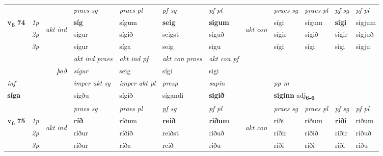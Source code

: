 \begin{longtable}[l]{X>{\footnotesize\itshape}llXXXXlXXXX}
 & &   & \textit{praes sg}  & \textit{praes pl}    & \textit{ pf sg} & \textit{pf pl} & & \textit{praes sg}  & \textit{praes pl}    & \textit{pf sg} & \textit{pf pl }  \\ \cmidrule{4-7} \cmidrule{9-12}
 \multirow{2}{*}{{{\textbf{v{\textsubscript{6}}} \Large{\textbf{74}}}}}  & 1p & \multirow{3}{*}{\begin{turn}{90}\textit{akt ind}\end{turn}} & \textbf{síg} & sígum & \textbf{seig} & \textbf{sigum} & \multirow{3}{*}{\begin{turn}{90}\textit{akt con}\end{turn}} &sígi & sígum & \textbf{sigi} & sigjum\\*
 & 2p &  &  sígur  & sígið & seigst & siguð & & sígir & sígið & sigir & sigjuð \\*
 & 3p &  & sígur & síga & seig & sigu & & sígi & sígi& sigi & sigju \\*
\cmidrule{4-7} \cmidrule{9-12}

   && &  \textit{akt ind praes} & \textit{akt ind pf} & \textit{akt con praes} & \textit{akt con pf} \\*
\multicolumn{3}{r}{\textit{það}} & sígur & seig & sígi & sigi \\*

\cmidrule{4-7}
   {\textit{inf}} & &  & \textit{imper akt sg} & \textit{imper akt pl}   & \textit{presp} & \textit{supin}  && \textit{pp m} \\*
  {\textbf{síga}} & && sígðu  & sígið   & sígandi &  \textbf{sigið}  && \multicolumn{2}{l}{\textbf{siginn} adj\textbf{\textsubscript{6-6}}} \\*

\midrule

 & &   & \textit{praes sg}  & \textit{praes pl}    & \textit{ pf sg} & \textit{pf pl} & & \textit{praes sg}  & \textit{praes pl}    & \textit{pf sg} & \textit{pf pl }  \\ \cmidrule{4-7} \cmidrule{9-12}
 \multirow{2}{*}{{{\textbf{v{\textsubscript{6}}} \Large{\textbf{75}}}}}  & 1p & \multirow{3}{*}{\begin{turn}{90}\textit{akt ind}\end{turn}} & \textbf{ríð} & ríðum & \textbf{reið} & \textbf{riðum} & \multirow{3}{*}{\begin{turn}{90}\textit{akt con}\end{turn}} &ríði & ríðum & \textbf{riði} & riðum\\*
 & 2p &  &  ríður  & ríðið & reiðst & riðuð & & ríðir & ríðið & riðir & riðuð \\*
 & 3p &  & ríður & ríða & reið & riðu & & ríði & ríði& riði & riðu \\*
\cmidrule{4-7} \cmidrule{9-12}


\end{longtable}
